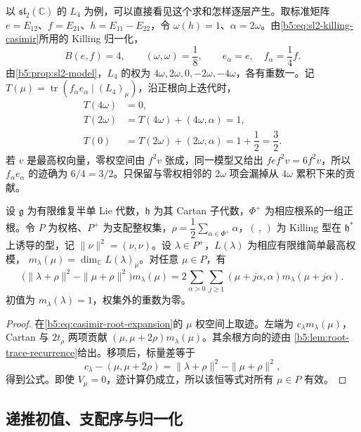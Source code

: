 以 \(\mathfrak{sl}_2(\mathbb C)\) 的 \(L_4\) 为例，可以直接看见这个求和怎样逐层产生。取标准矩阵 \(e=E_{12}\)、\(f=E_{21}\)、\(h=E_{11}-E_{22}\)，令 \(\omega(h)=1\)、\(\alpha=2\omega\)。由\eqref{b5:eq:sl2-killing-casimir}所用的 Killing 归一化，
\[
	B(e,f)=4,\qquad (\omega,\omega)=\dfrac18, \qquad e_\alpha=e,\quad f_\alpha=\dfrac14f.
\]
由\cref{b5:prop:sl2-model}，\(L_4\) 的权为 \(4\omega,2\omega,0,-2\omega,-4\omega\)，各有重数一。记 \(T(\mu)=\operatorname{tr}(f_\alpha e_\alpha\mid(L_4)_\mu)\)，沿正根向上迭代时，
\[
	\begin{aligned}
		T(4\omega)&=0,\\
		T(2\omega)&=T(4\omega)+(4\omega,\alpha)=1,\\
		T(0)&=T(2\omega)+(2\omega,\alpha)=1+\dfrac12=\dfrac32.
	\end{aligned}
\]
若 \(v\) 是最高权向量，零权空间由 \(f^2v\) 张成，同一模型又给出 \(fef^2v=6f^2v\)，所以 \(f_\alpha e_\alpha\) 的迹确为 \(6/4=3/2\)。只保留与零权相邻的 \(2\omega\) 项会漏掉从 \(4\omega\) 累积下来的贡献。

\begin{theorem}[Freudenthal 递推]\label{b5:thm:freudenthal}
	设 \(\mathfrak g\) 为有限维复半单 Lie 代数，\(\mathfrak h\) 为其 Cartan 子代数，\(\Phi^+\) 为相应根系的一组正根。令 \(P\) 为权格、\(P^+\) 为支配整权集，\(\rho=\dfrac12\sum_{\alpha\in\Phi^+}\alpha\)，\((\, ,\,)\) 为 Killing 型在 \(\mathfrak h^*\) 上诱导的型，记 \(\|\nu\|^2=(\nu,\nu)\)。设 \(\lambda\in P^+\)，\(L(\lambda)\) 为相应有限维简单最高权模， \(m_\lambda(\mu)=\dim_{\mathbb C}L(\lambda)_\mu\)。对任意 \(\mu\in P\)，有
	\begin{equation}\label{b5:eq:freudenthal}
		\bigl(\|\lambda+\rho\|^2-\|\mu+\rho\|^2\bigr)m_\lambda(\mu) =2\sum_{\alpha>0}\sum_{j\ge1} (\mu+j\alpha,\alpha)m_\lambda(\mu+j\alpha).
	\end{equation}
	初值为 \(m_\lambda(\lambda)=1\)，权集外的重数为零。
\end{theorem}
\begin{proof}
	在\eqref{b5:eq:casimir-root-expansion}的 \(\mu\) 权空间上取迹。左端为 \(c_\lambda m_\lambda(\mu)\)，Cartan 与 \(2t_\rho\) 两项贡献 \((\mu,\mu+2\rho)m_\lambda(\mu)\)。其余根方向的迹由 \cref{b5:lem:root-trace-recurrence}给出。移项后，标量差等于
	\[
		c_\lambda-(\mu,\mu+2\rho) =\|\lambda+\rho\|^2-\|\mu+\rho\|^2,
	\]
	得到公式。即使 \(V_\mu=0\)，迹计算仍成立，所以该恒等式对所有 \(\mu\in P\) 有效。
\end{proof}

\subsection{递推初值、支配序与归一化}
\label{b5:subsec:1902:03}

